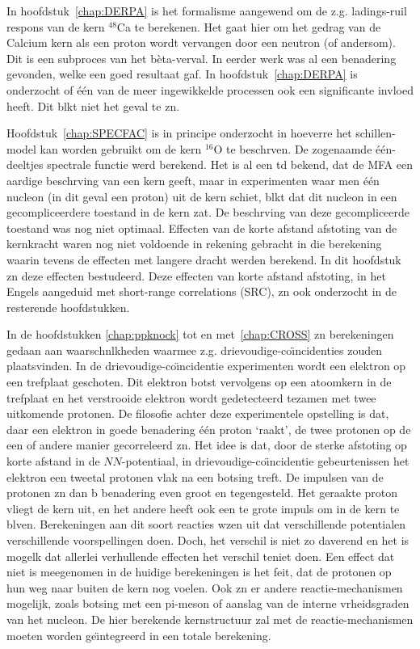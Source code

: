 In hoofdstuk~\ref{chap:DERPA} is het formalisme aangewend om  de z.g. 
ladings-ruil respons
van de kern $^{48}$Ca te berekenen. Het gaat hier om het gedrag van
de Calcium kern als een proton wordt vervangen door een neutron 
(of andersom). Dit is een subproces van het b\`eta-verval. 
In eerder werk was al een benadering gevonden, welke een goed resultaat gaf. 
In hoofdstuk~\ref{chap:DERPA} is onderzocht of \'e\'en van de meer 
ingewikkelde processen ook 
een significante invloed heeft. Dit bl{\ij}kt niet het geval te z{\ij}n.

Hoofdstuk~\ref{chap:SPECFAC} is in principe onderzocht in hoeverre het 
schillen-model kan worden gebruikt om de kern $^{16}$O te beschr{\ij}ven.
De zogenaamde \'e\'en-deeltjes spectrale functie werd berekend. 
Het is al een t{\ij}d bekend, dat de MFA een aardige beschr{\ij}ving van een kern 
geeft, 
maar in experimenten waar men \'e\'en nucleon (in dit geval een proton) 
uit de kern schiet, bl{\ij}kt dat dit nucleon in een gecompliceerdere 
toestand
in de kern zat. De beschr{\ij}ving van deze gecompliceerde toestand 
was nog niet
optimaal. Effecten van de korte afstand afstoting van de kernkracht waren nog 
niet voldoende in rekening gebracht in die berekening waarin tevens de 
effecten met langere dracht werden berekend. In dit hoofdstuk z{\ij}n
deze effecten bestudeerd.
Deze effecten van korte afstand afstoting, in het 
Engels aangeduid met short-range
correlations (SRC), z{\ij}n ook onderzocht in de resterende hoofdstukken.

In de hoofdstukken \ref{chap:ppknock} tot en 
met~\ref{chap:CROSS} z{\ij}n berekeningen
gedaan aan waarsch{\ij}nl{\ij}kheden waarmee z.g. drievoudige-co\"{\i}ncidenties
zouden plaatsvinden. In de drievoudige-co\"{\i}ncidentie experimenten 
wordt een elektron op een 
trefplaat geschoten. Dit elektron botst vervolgens op een atoomkern
in de trefplaat en het verstrooide elektron wordt gedetecteerd tezamen met twee 
uitkomende protonen. De filosofie achter deze experimentele opstelling is dat,
daar een elektron in goede benadering \'e\'en proton `raakt', de twee protonen
op de een of andere manier gecorreleerd z{\ij}n. Het idee is dat, door de sterke 
afstoting op korte afstand in de $NN$-potentiaal, in
drievoudige-co\"{\i}ncidentie gebeurtenissen het elektron een tweetal protonen 
vlak na een
botsing treft. De impulsen van de protonen z{\ij}n dan b{\ij} 
benadering even groot en 
tegengesteld.
Het geraakte proton vliegt de kern uit, en het andere heeft ook een te grote
impuls om in de kern te bl{\ij}ven. Berekeningen aan dit soort reacties 
w{\ij}zen uit
dat verschillende potentialen verschillende voorspellingen doen. Doch, het 
verschil is niet zo daverend en het is mogel{\ij}k dat allerlei verhullende 
effecten het verschil teniet doen. Een effect dat niet is meegenomen in de 
huidige berekeningen is het feit, dat de protonen op hun weg naar buiten de 
kern nog voelen. Ook z{\ij}n er andere reactie-mechanismen mogelijk, zoals
botsing met een pi-meson of aanslag van de interne vr{\ij}heidsgraden van het
nucleon.
De hier berekende kernstructuur zal met de reactie-mechanismen moeten worden 
ge\"{\i}ntegreerd in een totale berekening.
